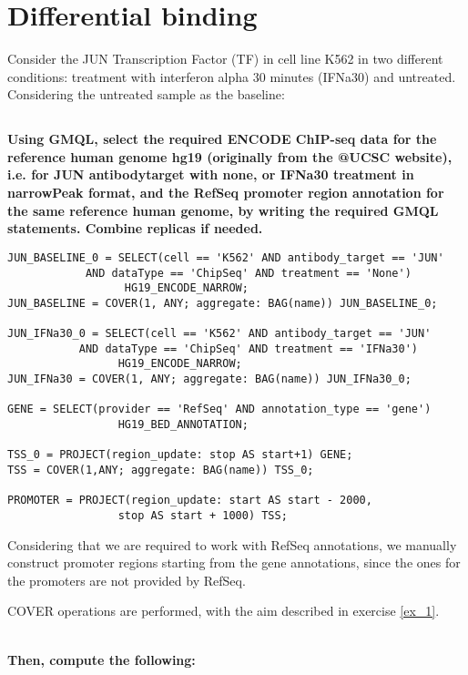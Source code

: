\documentclass[12pt, a4paper]{article}
\begin{document}
\section{Differential binding}

Consider the JUN Transcription Factor (TF) in cell line K562 in two different conditions: treatment with interferon alpha 30 minutes (IFNa30) and untreated.
Considering the untreated sample as the baseline:

\subsection{}
\textbf{Using GMQL, select the required ENCODE ChIP-seq data for the reference human genome hg19 (originally from the @UCSC website), i.e. for JUN antibody\textunderscore target with none, or IFNa30 treatment in narrowPeak format, and the RefSeq promoter region annotation for the same reference human genome, by writing the required GMQL statements. Combine replicas if needed. }

\begin{verbatim}
JUN_BASELINE_0 = SELECT(cell == 'K562' AND antibody_target == 'JUN'
            AND dataType == 'ChipSeq' AND treatment == 'None')
                  HG19_ENCODE_NARROW;
JUN_BASELINE = COVER(1, ANY; aggregate: BAG(name)) JUN_BASELINE_0;

JUN_IFNa30_0 = SELECT(cell == 'K562' AND antibody_target == 'JUN'
           AND dataType == 'ChipSeq' AND treatment == 'IFNa30')
                 HG19_ENCODE_NARROW;
JUN_IFNa30 = COVER(1, ANY; aggregate: BAG(name)) JUN_IFNa30_0;

GENE = SELECT(provider == 'RefSeq' AND annotation_type == 'gene')
                 HG19_BED_ANNOTATION;

TSS_0 = PROJECT(region_update: stop AS start+1) GENE;
TSS = COVER(1,ANY; aggregate: BAG(name)) TSS_0;

PROMOTER = PROJECT(region_update: start AS start - 2000,
                 stop AS start + 1000) TSS;
\end{verbatim}

Considering that we are required to work with RefSeq annotations, we manually construct promoter regions starting from the gene annotations, since the ones for the promoters are not provided by RefSeq.

COVER operations are performed, with the aim described in exercise \ref{ex_1}.

\textbf{\\ Then, compute the following:}
\end{document}
